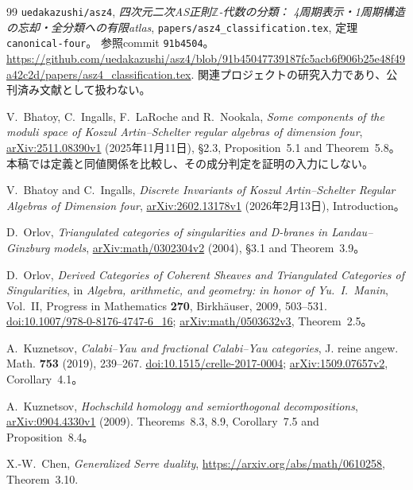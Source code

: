 \documentclass[11pt,a4paper]{ltjsarticle}
\numberwithin{equation}{section}
\begin{document}
\begin{thebibliography}{99}
\texttt{uedakazushi/asz4},
\emph{四次元二次AS正則$\mathbb Z$-代数の分類：
4周期表示・1周期構造の忘却・全分類への有限atlas},
\nolinkurl{papers/asz4_classification.tex}, 定理\texttt{canonical-four}。
参照commit \texttt{91b4504}。
\url{https://github.com/uedakazushi/asz4/blob/91b45047739187fc5acb6f906b25e48f49a42c2d/papers/asz4_classification.tex}.
関連プロジェクトの研究入力であり、公刊済み文献として扱わない。

V.~Bhatoy, C.~Ingalls, F.~LaRoche and R.~Nookala,
\emph{Some components of the moduli space of Koszul Artin--Schelter regular algebras of dimension four},
\href{https://arxiv.org/abs/2511.08390v1}{arXiv:2511.08390v1}
(2025年11月11日), \S2.3, Proposition~5.1 and Theorem~5.8。
本稿では定義と同値関係を比較し、その成分判定を証明の入力にしない。

V.~Bhatoy and C.~Ingalls,
\emph{Discrete Invariants of Koszul Artin--Schelter Regular Algebras of Dimension four},
\href{https://arxiv.org/abs/2602.13178v1}{arXiv:2602.13178v1}
(2026年2月13日), Introduction。

D.~Orlov,
\emph{Triangulated categories of singularities and D-branes in Landau--Ginzburg models},
\href{https://arxiv.org/abs/math/0302304v2}{arXiv:math/0302304v2}
(2004), \S3.1 and Theorem~3.9。

D.~Orlov,
\emph{Derived Categories of Coherent Sheaves and Triangulated Categories of Singularities},
in \emph{Algebra, arithmetic, and geometry: in honor of Yu.~I.~Manin},
Vol.~II, Progress in Mathematics \textbf{270}, Birkh\"auser, 2009, 503--531.
\href{https://doi.org/10.1007/978-0-8176-4747-6_16}{doi:10.1007/978-0-8176-4747-6\_16};
\href{https://arxiv.org/abs/math/0503632v3}{arXiv:math/0503632v3},
Theorem~2.5。

A.~Kuznetsov,
\emph{Calabi--Yau and fractional Calabi--Yau categories},
J. reine angew. Math. \textbf{753} (2019), 239--267.
\href{https://doi.org/10.1515/crelle-2017-0004}{doi:10.1515/crelle-2017-0004};
\href{https://arxiv.org/abs/1509.07657v2}{arXiv:1509.07657v2},
Corollary~4.1。

A.~Kuznetsov,
\emph{Hochschild homology and semiorthogonal decompositions},
\href{https://arxiv.org/abs/0904.4330v1}{arXiv:0904.4330v1} (2009).
Theorems~8.3, 8.9, Corollary~7.5 and Proposition~8.4。

X.-W.~Chen, \emph{Generalized Serre duality},
\url{https://arxiv.org/abs/math/0610258}, Theorem~3.10.


\end{thebibliography}
\end{document}
